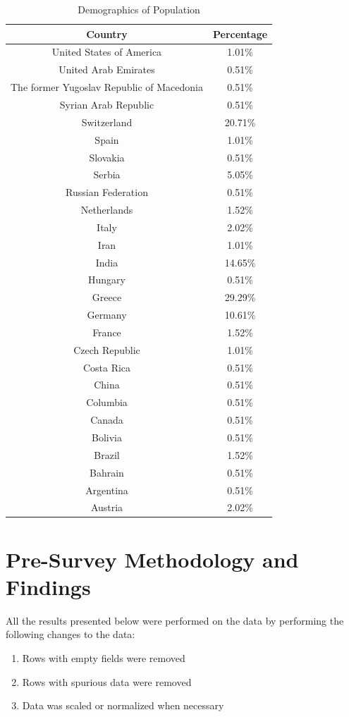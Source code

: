 \begin{table}[h!]
  \centering
  \caption{Demographics of Population}
  \label{tab:demo}
  \begin{tabular}{cc}
    \toprule
     Country&Percentage\\
    \midrule
United States of America&1.01\%\\
United Arab Emirates&0.51\%\\
The former Yugoslav Republic of Macedonia&0.51\%\\
Syrian Arab Republic	&0.51\%\\
Switzerland&20.71\%\\
Spain	&1.01\%\\
Slovakia	&0.51\%\\
Serbia&	5.05\%\\
Russian Federation&	0.51\%\\
Netherlands	&1.52\%\\
Italy	&2.02\%\\
Iran&1.01\%\\
India	&14.65\%\\
Hungary	&0.51\%\\
Greece	&29.29\%\\
Germany	&10.61\%\\
France	&1.52\%\\
Czech Republic	&1.01\%\\
Costa Rica	&0.51\%\\
China	&0.51\%\\
Columbia	&0.51\%\\
Canada	&0.51\%\\
Bolivia	&0.51\%\\
Brazil	&1.52\%\\
Bahrain	&0.51\%\\
Argentina	&0.51\%\\
Austria & 2.02\%\\
    \bottomrule
  \end{tabular}
\end{table}

\section{Pre-Survey Methodology and Findings}
All the results presented below were performed on the data by performing the following changes to the data:
\begin{enumerate}
\item Rows with empty fields were removed
\item Rows with spurious data were removed
\item Data was scaled or normalized when necessary
\end{enumerate}

